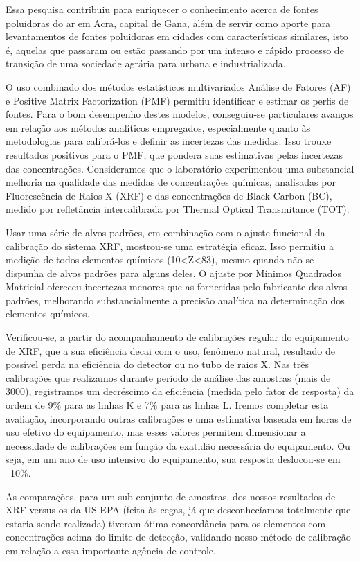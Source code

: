 Essa pesquisa contribuiu para enriquecer o conhecimento acerca de fontes poluidoras do ar em Acra, capital de Gana, além de servir como aporte para levantamentos de fontes poluidoras em cidades com características similares, isto é, aquelas que passaram ou estão passando por um intenso e rápido processo de transição de uma sociedade agrária para urbana e industrializada.%

O uso combinado dos métodos estatísticos multivariados Análise de Fatores (AF) e Positive Matrix Factorization (PMF) permitiu identificar e estimar os perfis de fontes. Para o bom desempenho destes modelos, conseguiu-se particulares avanços em relação aos métodos analíticos empregados, especialmente quanto às metodologias para calibrá-los e definir as incertezas das medidas. Isso trouxe resultados positivos para o PMF, que pondera suas estimativas pelas incertezas das concentrações. Consideramos que o laboratório experimentou uma substancial melhoria na qualidade das medidas de concentrações químicas, analisadas por Fluorescência de Raios X (XRF) e das concentrações de Black Carbon (BC), medido por refletância intercalibrada por Thermal Optical Transmitance (TOT). 

Usar uma série de alvos padrões, em combinação com o ajuste funcional da calibração do sistema XRF, mostrou-se uma estratégia eficaz. Isso permitiu a medição de todos elementos químicos (10<Z<83), mesmo quando não se dispunha de alvos padrões para alguns deles. O ajuste por Mínimos Quadrados Matricial ofereceu incertezas menores que as fornecidas pelo fabricante dos alvos padrões, melhorando substancialmente a precisão analítica na determinação dos elementos químicos.

Verificou-se, a partir do acompanhamento de calibrações regular do equipamento de XRF, que a sua eficiência decai com o uso, fenômeno natural, resultado de possível perda na eficiência do detector ou no tubo de raios X. Nas três calibrações que realizamos durante período de análise das amostras (mais de 3000), registramos um decréscimo da eficiência (medida pelo fator de resposta) da ordem de 9\% para as linhas K e 7\% para as linhas L. Iremos completar esta avaliação, incorporando outras calibrações e uma estimativa baseada em horas de uso efetivo do equipamento, mas esses valores permitem dimensionar a necessidade de calibrações em função da exatidão necessária do equipamento. Ou seja, em um ano de uso intensivo do equipamento, sua resposta deslocou-se em ~10\%.

As comparações, para um sub-conjunto de amostras, dos nossos resultados de XRF versus os da US-EPA (feita às cegas, já que desconhecíamos totalmente que estaria sendo realizada) tiveram ótima concordância para os elementos com concentrações acima do limite de detecção, validando nosso método de calibração em relação a essa importante agência de controle.%
  

